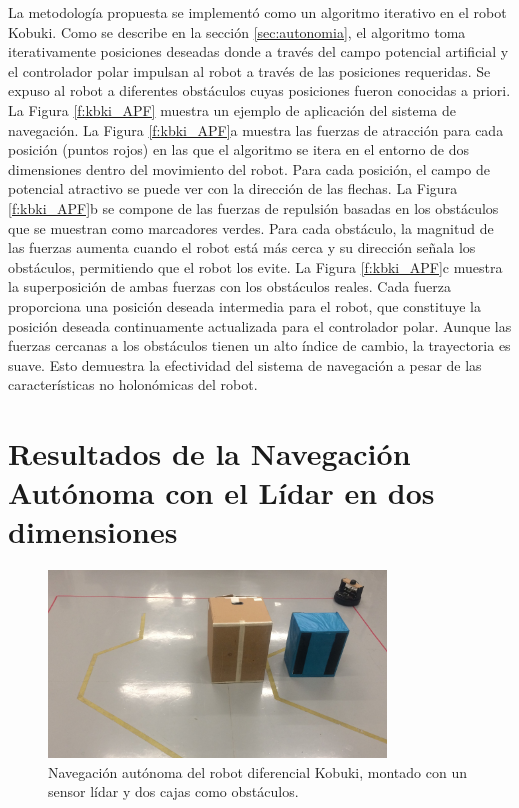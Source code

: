La metodología propuesta se implementó como un algoritmo iterativo en el robot Kobuki. 
Como se describe en la sección \ref{sec:autonomia}, el algoritmo toma iterativamente 
posiciones deseadas  donde a través del campo potencial artificial y el controlador 
polar impulsan al robot a través de las posiciones requeridas. Se expuso al robot 
a diferentes obstáculos cuyas posiciones fueron conocidas a priori. La Figura \ref{f:kbki_APF} muestra un ejemplo de aplicación del sistema de navegación. La Figura 
\ref{f:kbki_APF}a muestra las fuerzas de atracción para cada posición (puntos rojos) en 
las que el algoritmo se itera en el entorno de dos dimensiones dentro del movimiento del 
robot. Para cada posición, el campo de potencial atractivo se puede ver con la dirección 
de las flechas. La Figura \ref{f:kbki_APF}b se compone de las fuerzas de repulsión basadas en 
los obstáculos que se muestran como marcadores verdes. Para cada obstáculo, la magnitud de 
las fuerzas aumenta cuando el robot está más cerca y su dirección señala los obstáculos, permitiendo 
que el robot los evite. La Figura \ref{f:kbki_APF}c muestra la superposición de ambas fuerzas 
con los obstáculos reales. Cada fuerza proporciona una posición deseada intermedia para el 
robot, que constituye la posición deseada continuamente actualizada para el controlador 
polar. Aunque las fuerzas cercanas a los obstáculos tienen un alto índice de cambio, la 
trayectoria es suave. Esto demuestra la efectividad del sistema de navegación a pesar de las 
características no holonómicas del robot.

\section{Resultados de la Navegación Autónoma con el Lídar en dos dimensiones}
\begin{figure}%
  \centering \footnotesize
  \includegraphics[width=0.80\textwidth]{images/kobuki_201.jpg}
  \captionsetup{font=footnotesize}
  \caption{Navegación autónoma del robot diferencial Kobuki, montado con un 
  sensor lídar y dos cajas como obstáculos.}
  \label{fig:Kobuki201}
\end{figure}

